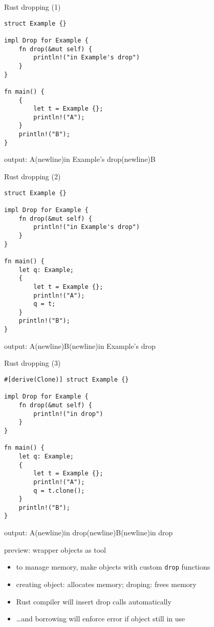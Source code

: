 \begin{frame}[fragile]{Rust dropping (1)}
\begin{verbatim}
struct Example {}

impl Drop for Example {
    fn drop(&mut self) {
        println!("in Example's drop")
    }
}

fn main() {
    {
        let t = Example {};
        println!("A");
    }
    println!("B");
}
\end{verbatim}
output: A(newline)in Example's drop(newline)B
\end{frame}

\begin{frame}[fragile]{Rust dropping (2)}
\begin{verbatim}
struct Example {}

impl Drop for Example {
    fn drop(&mut self) {
        println!("in Example's drop")
    }
}

fn main() {
    let q: Example;
    {
        let t = Example {};
        println!("A");
        q = t;
    }
    println!("B");
}
\end{verbatim}
output: A(newline)B(newline)in Example's drop
\end{frame}

\begin{frame}[fragile]{Rust dropping (3)}
\begin{verbatim}
#[derive(Clone)] struct Example {}

impl Drop for Example {
    fn drop(&mut self) {
        println!("in drop")
    }
}

fn main() {
    let q: Example;
    {
        let t = Example {};
        println!("A");
        q = t.clone();
    }
    println!("B");
}
\end{verbatim}
output: A(newline)in drop(newline)B(newline)in drop
\end{frame}

\begin{frame}{preview: wrapper objects as tool}
    \begin{itemize}
    \item to manage memory, make objects with custom \texttt{drop} functions
    \item creating object: allocates memory; droping: frees memory
    \vspace{.5cm}
    \item Rust compiler will insert drop calls automatically
    \item \ldots and borrowing will enforce error if object still in use
    \end{itemize}
\end{frame}

